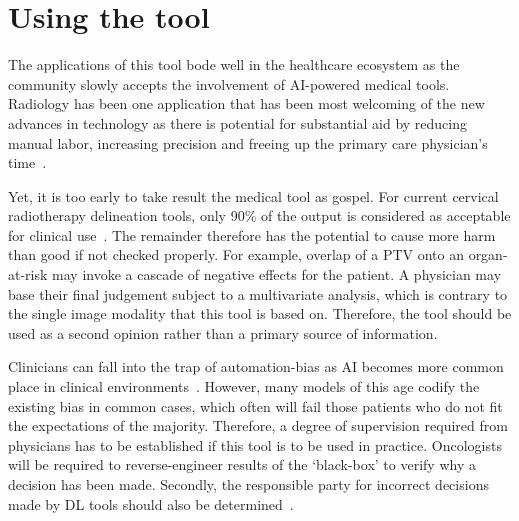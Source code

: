 \documentclass[12pt,twoside]{report}
\begin{document}
\section{Using the tool}\label{sect:using-the-tool}

The applications of this tool bode well in the healthcare ecosystem as the community slowly accepts the involvement of AI-powered medical tools. Radiology has been one application that has been most welcoming of the new advances in technology as there is potential for substantial aid by reducing manual labor, increasing precision and freeing up the primary care physician's time~\cite{Amisha2019-ki}.

Yet, it is too early to take result the medical tool as gospel. For current cervical radiotherapy delineation tools, only 90\% of the output is considered as acceptable for clinical use~\cite{LIU2020172}. The remainder therefore has the potential to cause more harm than good if not checked properly. For example, overlap of a PTV onto an organ-at-risk may invoke a cascade of negative effects for the patient. A physician may base their final judgement subject to a multivariate analysis, which is contrary to the single image modality that this tool is based on. Therefore, the tool should be used as a second opinion rather than a primary source of information.

Clinicians can fall into the trap of automation-bias as AI becomes more common place in clinical environments~\cite{STRAW2020101965}. However, many models of this age codify the existing bias in common cases, which often will fail those patients who do not fit the expectations of the majority. Therefore, a degree of supervision required from physicians has to be established if this tool is to be used in practice. Oncologists will be required to reverse-engineer results of the `black-box' to verify why a decision has been made. Secondly, the responsible party for incorrect decisions made by DL tools should also be determined~\cite{Chen2021-dg}.



\end{document}
